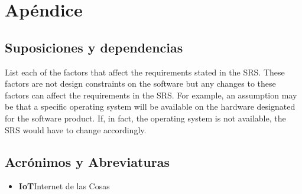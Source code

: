 \documentclass[12pt, a4paper, twoside]{article}
\newcommand\ttab{\tab \hspace{-5cm}}
\begin{document}
\section{Apéndice}
\subsection{Suposiciones y dependencias}
List each of the factors that affect the requirements stated in the SRS. These factors are not design
constraints on the software but any changes to these factors can affect the requirements in the SRS.
For example, an assumption may be that a specific operating system will be available on the hardware
designated for the software product. If, in fact, the operating system is not available, the SRS would
have to change accordingly.
\subsection{Acrónimos y Abreviaturas}
\begin{itemize}
    \item \textbf{IoT}\ttab Internet de las Cosas
  \end{itemize}
\end{document}
